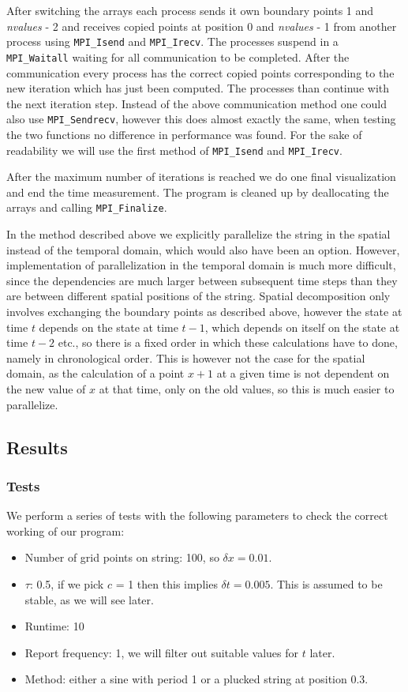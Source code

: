 \documentclass[11pt,a4paper,onecolumn]{article}
\begin{document}
After switching the arrays each process sends it own boundary points 1 and \emph{nvalues} - 2 and receives copied points at position 0 and \emph{nvalues} - 1 from another process using \texttt{MPI\_Isend} and \texttt{MPI\_Irecv}. The processes suspend in a \texttt{MPI\_Waitall} waiting for all communication to be completed. After the communication every process has the correct copied points corresponding to the new iteration which has just been computed. The processes than continue with the next iteration step. Instead of the above communication method one could also use \texttt{MPI\_Sendrecv}, however this does almost exactly the same, when testing the two functions no difference in performance was found. For the sake of readability we will use the first method of \texttt{MPI\_Isend} and \texttt{MPI\_Irecv}. 

After the maximum number of iterations is reached we do one final visualization and end the time measurement. The program is cleaned up by deallocating the arrays and calling \texttt{MPI\_Finalize}.

In the method described above we explicitly parallelize the string in the spatial instead of the temporal domain, which would also have been an option. However, implementation of parallelization in the temporal domain is much more difficult, since the dependencies are much larger between subsequent time steps than they are between different spatial positions of the string. Spatial decomposition only involves exchanging the boundary points as described above, however the state at time $t$ depends on the state at time $t-1$, which depends on itself on the state at time $t-2$ etc., so there is a fixed order in which these calculations have to done, namely in chronological order. This is however not the case for the spatial domain, as the calculation of a point $x+1$ at a given time is not dependent on the new value of $x$ at that time, only on the old values, so this is much easier to parallelize.

\subsection{Results}
\subsubsection{Tests}
We perform a series of tests with the following parameters to check the correct working of our program:
\begin{itemize}
\item 
  Number of grid points on string: 100, so $\delta x = 0.01$.
\item
  $\tau$: 0.5, if we pick $c$ = 1 then this implies $\delta t = 0.005$. This is assumed to be stable, as we will see later. 
\item
  Runtime: 10
\item
  Report frequency: 1, we will filter out suitable values for $t$ later.
\item
  Method: either a sine with period 1 or a plucked string at position 0.3.
\end{itemize}
\end{document}
